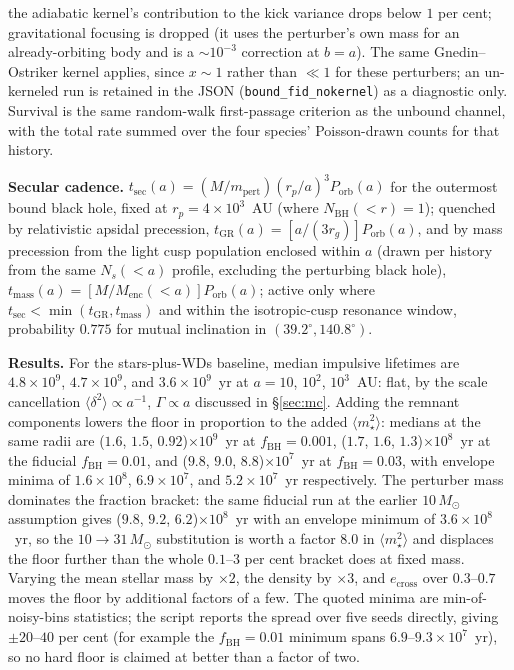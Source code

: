 \documentclass[11pt]{article}
\newcommand{\msun}{\ensuremath{M_\odot}}
\begin{document}
the adiabatic kernel's contribution to the kick variance drops below $1$ per cent; gravitational focusing is dropped (it uses the perturber's own mass for an already-orbiting body and is a $\sim 10^{-3}$ correction at $b = a$). The same Gnedin--Ostriker kernel applies, since $x \sim 1$ rather than $\ll 1$ for these perturbers; an un-kerneled run is retained in the JSON (\texttt{bound\_fid\_nokernel}) as a diagnostic only. Survival is the same random-walk first-passage criterion as the unbound channel, with the total rate summed over the four species' Poisson-drawn counts for that history.

\textbf{Secular cadence.} $t_{\mathrm{sec}}(a) = (M/m_{\mathrm{pert}})(r_{p}/a)^{3}P_{\mathrm{orb}}(a)$ for the outermost bound black hole, fixed at $r_{p} = 4\times10^{3}$~AU (where $N_{\mathrm{BH}}(<r) = 1$); quenched by relativistic apsidal precession, $t_{\mathrm{GR}}(a) = [a/(3r_{g})]P_{\mathrm{orb}}(a)$, and by mass precession from the light cusp population enclosed within $a$ (drawn per history from the same $N_{s}(<a)$ profile, excluding the perturbing black hole), $t_{\mathrm{mass}}(a) = [M/M_{\mathrm{enc}}(<a)]P_{\mathrm{orb}}(a)$; active only where $t_{\mathrm{sec}} < \min(t_{\mathrm{GR}}, t_{\mathrm{mass}})$ and within the isotropic-cusp resonance window, probability $0.775$ for mutual inclination in $(39.2^{\circ}, 140.8^{\circ})$.

\textbf{Results.} For the stars-plus-WDs baseline, median impulsive lifetimes are $4.8\times10^{9}$, $4.7\times10^{9}$, and $3.6\times10^{9}$~yr at $a = 10$, $10^{2}$, $10^{3}$~AU: flat, by the scale cancellation $\langle\delta^{2}\rangle \propto a^{-1}$, $\Gamma \propto a$ discussed in \S\ref{sec:mc}. Adding the remnant components lowers the floor in proportion to the added $\langle m_{\star}^{2}\rangle$: medians at the same radii are ($1.6$, $1.5$, $0.92$)$\times10^{9}$~yr at $f_{\mathrm{BH}} = 0.001$, ($1.7$, $1.6$, $1.3$)$\times10^{8}$~yr at the fiducial $f_{\mathrm{BH}} = 0.01$, and ($9.8$, $9.0$, $8.8$)$\times10^{7}$~yr at $f_{\mathrm{BH}} = 0.03$, with envelope minima of $1.6\times10^{8}$, $6.9\times10^{7}$, and $5.2\times10^{7}$~yr respectively. The perturber mass dominates the fraction bracket: the same fiducial run at the earlier $10\,\msun$ assumption gives ($9.8$, $9.2$, $6.2$)$\times10^{8}$~yr with an envelope minimum of $3.6\times10^{8}$~yr, so the $10 \to 31\,\msun$ substitution is worth a factor $8.0$ in $\langle m_{\star}^{2}\rangle$ and displaces the floor further than the whole $0.1$--$3$ per cent bracket does at fixed mass. Varying the mean stellar mass by $\times 2$, the density by $\times 3$, and $e_{\mathrm{cross}}$ over $0.3$--$0.7$ moves the floor by additional factors of a few. The quoted minima are min-of-noisy-bins statistics; the script reports the spread over five seeds directly, giving $\pm 20$--$40$ per cent (for example the $f_{\mathrm{BH}} = 0.01$ minimum spans $6.9$--$9.3\times10^{7}$~yr), so no hard floor is claimed at better than a factor of two.
\end{document}
